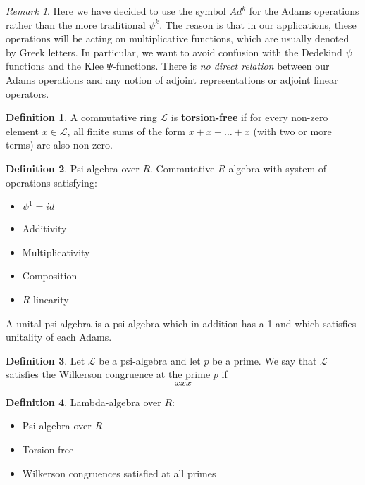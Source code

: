 \documentclass[a4paper]{article}
\theoremstyle{definition}
\newtheorem{definition}{Definition}[section]
\theoremstyle{remark}
\newtheorem*{remark}{Remark}
\newcommand{\defhl}[1]{\textbf{#1}}
\begin{document}
\begin{remark}
Here we have decided to use the symbol $Ad^k$ for the Adams operations rather than the more traditional $\psi^k$. The reason is that in our applications, these operations will be acting on multiplicative functions, which are usually denoted by Greek letters. In particular, we want to avoid confusion with the Dedekind $\psi$ functions and the Klee $\Psi$-functions. There is \emph{no direct relation} between our Adams operations and any notion of adjoint representations or adjoint linear operators.
\end{remark}

\begin{definition}
A commutative ring $\mathcal{L}$ is \defhl{torsion-free} if for every non-zero element $x \in \mathcal{L}$, all finite sums of the form $x+x+ \ldots +x$ (with two or more terms) are also non-zero.
\end{definition}

\begin{definition}
Psi-algebra over $R$. Commutative $R$-algebra with system of operations satisfying:
\begin{itemize}
\item $\psi^1 = id$
\item Additivity
\item Multiplicativity
\item Composition
\item $R$-linearity
\end{itemize}
A unital psi-algebra is a psi-algebra which in addition has a 1 and which satisfies unitality of each Adams.
\end{definition}


\begin{definition}
Let $\mathcal{L}$ be a psi-algebra and let $p$ be a prime. We say that $\mathcal{L}$ satisfies the Wilkerson congruence at the prime $p$ if
$$   xxx   $$
\end{definition}

\begin{definition}
Lambda-algebra over $R$:
\begin{itemize}
\item Psi-algebra over $R$
\item Torsion-free
\item Wilkerson congruences satisfied at all primes

\end{itemize}
\end{definition}
\end{document}
